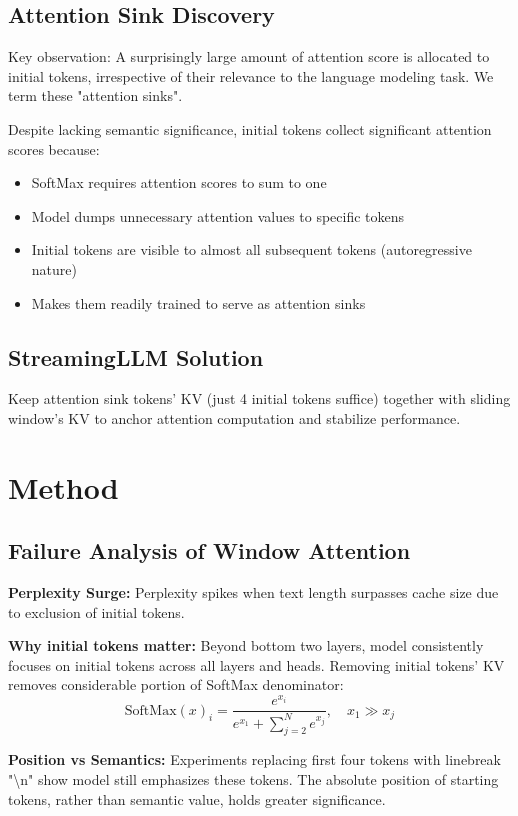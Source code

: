 \subsection{Attention Sink Discovery}
Key observation: A surprisingly large amount of attention score is allocated to initial tokens, irrespective of their relevance to the language modeling task. We term these "attention sinks".

Despite lacking semantic significance, initial tokens collect significant attention scores because:
\begin{itemize}
\item SoftMax requires attention scores to sum to one
\item Model dumps unnecessary attention values to specific tokens
\item Initial tokens are visible to almost all subsequent tokens (autoregressive nature)
\item Makes them readily trained to serve as attention sinks
\end{itemize}

\subsection{StreamingLLM Solution}
Keep attention sink tokens' KV (just 4 initial tokens suffice) together with sliding window's KV to anchor attention computation and stabilize performance.

\section{Method}

\subsection{Failure Analysis of Window Attention}
\textbf{Perplexity Surge:} Perplexity spikes when text length surpasses cache size due to exclusion of initial tokens.

\textbf{Why initial tokens matter:} Beyond bottom two layers, model consistently focuses on initial tokens across all layers and heads. Removing initial tokens' KV removes considerable portion of SoftMax denominator:
\begin{equation}
\text{SoftMax}(x)_i = \frac{e^{x_i}}{e^{x_1} + \sum_{j=2}^N e^{x_j}}, \quad x_1 \gg x_j
\end{equation}

\textbf{Position vs Semantics:} Experiments replacing first four tokens with linebreak "\textbackslash n" show model still emphasizes these tokens. The absolute position of starting tokens, rather than semantic value, holds greater significance.

